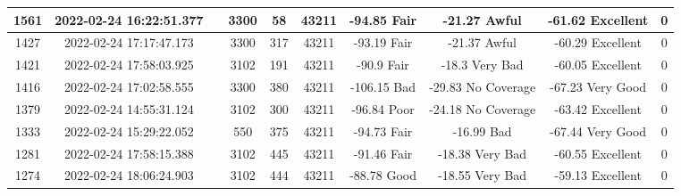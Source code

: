 \begin{longtable*}{|c|c|c|c|c|c|c|c|c|c|}
1561&2022-02-24 16:22:51.377&&3300&58&43211& -94.85    Fair        & -21.27    Awful       & -61.62    Excellent   & 0\\\hline
{}1427&2022-02-24 17:17:47.173&&3300&317&43211& -93.19    Fair        & -21.37    Awful       & -60.29    Excellent   & 0\\\hline
{}1421&2022-02-24 17:58:03.925&&3102&191&43211& -90.9     Fair        & -18.3     Very Bad    & -60.05    Excellent   & 0\\\hline
{}1416&2022-02-24 17:02:58.555&&3300&380&43211& -106.15   Bad         & -29.83    No Coverage & -67.23    Very Good   & 0\\\hline
{}1379&2022-02-24 14:55:31.124&&3102&300&43211& -96.84    Poor        & -24.18    No Coverage & -63.42    Excellent   & 0\\\hline
{}1333&2022-02-24 15:29:22.052&&550&375&43211& -94.73    Fair        & -16.99    Bad         & -67.44    Very Good   & 0\\\hline
{}1281&2022-02-24 17:58:15.388&&3102&445&43211& -91.46    Fair        & -18.38    Very Bad    & -60.55    Excellent   & 0\\\hline
{}1274&2022-02-24 18:06:24.903&&3102&444&43211& -88.78    Good        & -18.55    Very Bad    & -59.13    Excellent   & 0\\\hline

\end{longtable*}
